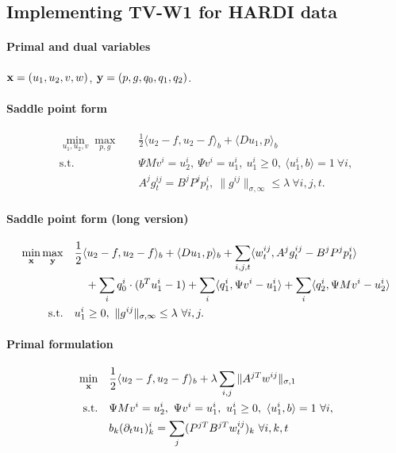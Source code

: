 
\subsection{Implementing TV-W1 for HARDI data}

\paragraph{Primal and dual variables}
$\mathbf{x} = (u_1,u_2,v,w)$, $\mathbf{y} = (p,g,q_0,q_1,q_2)$.

\paragraph{Saddle point form}
\begin{align*}
    \min_{u_1,u_2,v} \max_{p,g} \quad
        & \frac{1}{2} \langle u_2 - f, u_2 - f \rangle_b + \langle Du_1, p \rangle_b \\
    \text{s.t.}\quad
        & \Psi M v^i = u_2^i, ~\Psi v^i = u_1^i,
          ~u_1^i \geq 0, ~\langle u_1^i, b \rangle = 1 ~\forall i, \\
        & A^j g^{ij}_t = B^j P^j p^i_t,
          ~\|g^{ij}\|_{\sigma,\infty} \leq \lambda ~\forall i,j,t.
\end{align*}

\paragraph{Saddle point form (long version)}
\begin{align*}
    \min_{\mathbf{x}} \max_{\mathbf{y}} \quad
        & \frac{1}{2} \langle u_2 - f, u_2 - f \rangle_b
            + \langle Du_1, p \rangle_b
            + \sum_{i,j,t} \langle w^{ij}_t, A^j g^{ij}_t - B^j P^j p^i_t \rangle \\
        &\quad + \sum_{i} q_0^i \cdot (b^T u_1^i - 1)
            + \sum_{i} \langle q_1^i, \Psi v^i - u_1^i \rangle
            + \sum_{i} \langle q_2^i, \Psi M v^i - u_2^i \rangle \\
    \text{s.t.}\quad
        & u_1^i \geq 0, ~\|g^{ij}\|_{\sigma,\infty} \leq \lambda ~\forall i,j.
\end{align*}

\paragraph{Primal formulation}
\begin{align*}
    \min_{\mathbf{x}} \quad
        & \frac{1}{2} \langle u_2 - f, u_2 - f \rangle_b
            + \lambda \sum_{i,j} \| A^{jT} w^{ij} \|_{\sigma,1} \\
    \text{s.t.}\quad
        & \Psi M v^i = u_2^i, ~\Psi v^i = u_1^i,
          ~u_1^i \geq 0, ~\langle u_1^i, b \rangle = 1 ~\forall i, \\
        & b_k (\partial_t u_1)_k^i = \sum_j (P^{jT}B^{jT}w^{ij}_t)_{k} ~\forall i,k,t
\end{align*}

